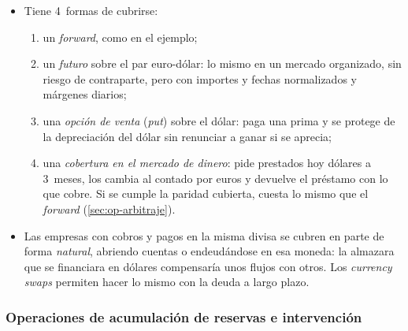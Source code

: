 \documentclass[11pt]{article}
\begin{document}
\begin{itemize}
\begin{itemize}
  \item si los vende a plazo, cobrará con certeza unos 854.100~euros, pase lo que pase con el dólar;
  \item renuncia así a ganar si el dólar se aprecia, a cambio de no perder si se deprecia. La cobertura sacrifica la ganancia posible a cambio de la certeza, como en «ande yo caliente, y ríase la gente»: si el dólar se aprecia, otros presumirán de lo que ganaron sin cubrirse, pero la empresa sabe desde hoy cuántos euros cobrará.
  \end{itemize}
\item Tiene 4~formas de cubrirse:
  \begin{enumerate}
  \item un \emph{forward}, como en el ejemplo;
  \item un \emph{futuro} sobre el par euro-dólar: lo mismo en un mercado organizado, sin riesgo de contraparte, pero con importes y fechas normalizados y márgenes diarios;
  \item una \emph{opción de venta} (\emph{put}) sobre el dólar: paga una prima y se protege de la depreciación del dólar sin renunciar a ganar si se aprecia;
  \item una \emph{cobertura en el mercado de dinero}: pide prestados hoy dólares a 3~meses, los cambia al contado por euros y devuelve el préstamo con lo que cobre. Si se cumple la paridad cubierta, cuesta lo mismo que el \emph{forward} (\ref{sec:op-arbitraje}).
  \end{enumerate}
\item Las empresas con cobros y pagos en la misma divisa se cubren en parte de forma \emph{natural}, abriendo cuentas o endeudándose en esa moneda: la almazara que se financiara en dólares compensaría unos flujos con otros. Los \emph{currency swaps} permiten hacer lo mismo con la deuda a largo plazo.
\end{itemize}

\subsubsection{Operaciones de acumulación de reservas e intervención}\label{sec:op-reservas}
\end{document}

